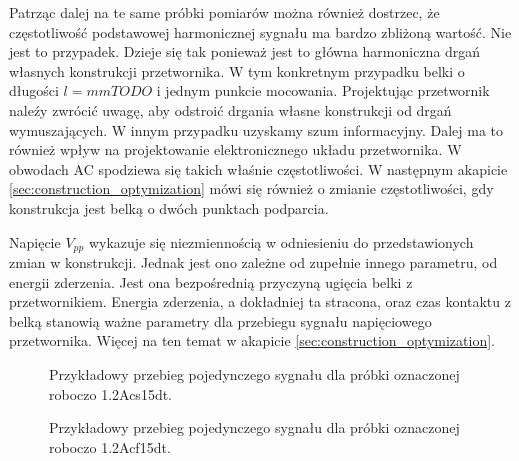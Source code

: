 \indent Patrząc dalej na te same próbki pomiarów można również dostrzec, że częstotliwość podstawowej harmonicznej sygnału ma bardzo zbliżoną wartość. Nie jest to przypadek. Dzieje się tak ponieważ jest to główna harmoniczna drgań własnych konstrukcji przetwornika. W tym konkretnym przypadku belki o długości $l = mmTODO$ i jednym punkcie mocowania. Projektując przetwornik naleźy zwrócić uwagę, aby odstroić drgania własne konstrukcji od drgań wymuszających. W innym przypadku uzyskamy szum informacyjny. Dalej ma to również wpływ na projektowanie elektronicznego układu przetwornika. W obwodach AC spodziewa się takich właśnie częstotliwości. W następnym akapicie \ref{sec:construction_optymization} mówi się również o zmianie częstotliwości, gdy konstrukcja jest belką o dwóch punktach podparcia. 

Napięcie $V_{pp}$ wykazuje się niezmiennością w odniesieniu do przedstawionych zmian w konstrukcji. Jednak jest ono zależne od zupełnie innego parametru, od energii zderzenia. Jest ona bezpośrednią przyczyną ugięcia belki z przetwornikiem. Energia zderzenia, a dokładniej ta stracona, oraz czas kontaktu z belką stanowią ważne parametry dla przebiegu sygnału napięciowego przetwornika. Więcej na ten temat w akapicie \ref{sec:construction_optymization}.

\begin{figure}[htbp]
\centering
{}%
\caption{Przykładowy przebieg pojedynczego sygnału dla próbki oznaczonej roboczo 1.2Acs15dt.}
\label{fig:scope_without_silencer}
\end{figure}

\begin{figure}[htbp]
\centering
{}%
\caption{Przykładowy przebieg pojedynczego sygnału dla próbki oznaczonej roboczo 1.2Acf15dt.}
\label{fig:scope_with_silencer}
\end{figure}
